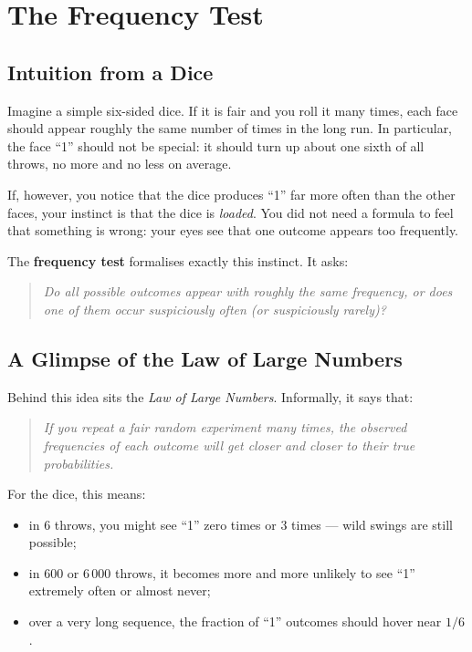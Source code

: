 \chapter{The Frequency Test}

\section{Intuition from a Dice}
Imagine a simple six-sided dice.  If it is fair and you roll it many times, each face should appear roughly the same number of times in the long run.  In particular, the face ``1'' should not be special: it should turn up about one sixth of all throws, no more and no less on average.

If, however, you notice that the dice produces ``1'' far more often than the other faces, your instinct is that the dice is \emph{loaded}.  You did not need a formula to feel that something is wrong: your eyes see that one outcome appears too frequently.

The \textbf{frequency test} formalises exactly this instinct.  It asks:
\begin{quote}
  \emph{Do all possible outcomes appear with roughly the same frequency, or does one of them occur suspiciously often (or suspiciously rarely)?}
\end{quote}

\section{A Glimpse of the Law of Large Numbers}
Behind this idea sits the \emph{Law of Large Numbers}.  Informally, it says that:
\begin{quote}
  \emph{If you repeat a fair random experiment many times, the observed frequencies of each outcome will get closer and closer to their true probabilities.}
\end{quote}

For the dice, this means:
\begin{itemize}
  \item in 6 throws, you might see ``1'' zero times or 3 times --- wild swings are still possible;
  \item in 600 or 6\,000 throws, it becomes more and more unlikely to see ``1'' extremely often or almost never;
  \item over a very long sequence, the fraction of ``1'' outcomes should hover near \(1/6\).
\end{itemize}


